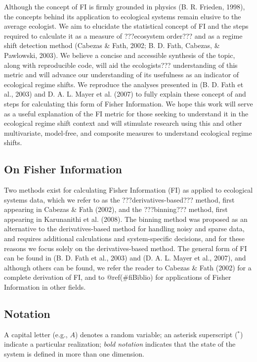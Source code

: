 \documentclass[12pt,twoside,openany]{reedthesis}
\begin{document}
Although the concept of FI is firmly grounded in physics (B. R. Frieden,
1998), the concepts behind its application to ecological systems remain
elusive to the average ecologist. We aim to elucidate the statistical
concept of FI and the steps required to calculate it as a measure of
???ecosystem order??? and as a regime shift detection method (Cabezas \&
Fath, 2002; B. D. Fath, Cabezas, \& Pawlowski, 2003). We believe a
concise and accessible synthesis of the topic, along with reproducible
code, will aid the ecologists??? understanding of this metric and will
advance our understanding of its usefulness as an indicator of
ecological regime shifts. We reproduce the analyses presented in (B. D.
Fath et al., 2003) and D. A. L. Mayer et al. (2007) to fully explain
these concept of and steps for calculating this form of Fisher
Information. We hope this work will serve as a useful explanation of the
FI metric for those seeking to understand it in the ecological regime
shift context and will stimulate research using this and other
multivariate, model-free, and composite measures to understand
ecological regime shifts.

\subsection{On Fisher Information}\label{on-fisher-information}

Two methods exist for calculating Fisher Information (FI) as applied to
ecological systems data, which we refer to as the
???derivatives-based??? method, first appearing in Cabezas \& Fath
(2002), and the ???binning??? method, first appearing in Karunanithi et
al. (2008). The binning method was proposed as an alternative to the
derivatives-based method for handling noisy and sparse data, and
requires additional calculations and system-specific decisions, and for
these reasons we focus solely on the derivatives-based method. The
general form of FI can be found in (B. D. Fath et al., 2003) and (D. A.
L. Mayer et al., 2007), and although others can be found, we refer the
reader to Cabezas \& Fath (2002) for a complete derivation of FI, and to
@ref(\#fiBiblio) for applications of Fisher Information in other fields.

\subsection{Notation}\label{notation}

A capital letter (e.g., \(A\)) denotes a random variable; an asterisk
superscript (\(^*\)) indicate a particular realization; \emph{bold
notation} indicates that the state of the system is defined in more than
one dimension.
\end{document}
